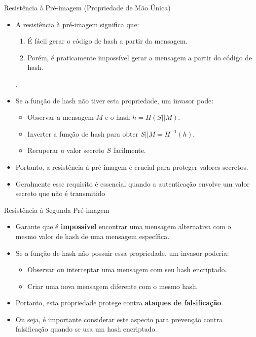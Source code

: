 \begin{frame}{Resistência à Pré-imagem (Propriedade de Mão Única)}
    \begin{itemize}
        \item A resistência à pré-imagem significa que:
              \begin{enumerate}
                  \item É fácil gerar o código de hash a partir da mensagem.
                  \item Porém, é praticamente impossível gerar a mensagem a partir do código de hash.
              \end{enumerate}
              .
        \item Se a função de hash não tiver esta propriedade, um invasor pode:
              \begin{itemize}
                  \item Observar a mensagem $M$ e o hash $h = H(S || M)$.
                  \item Inverter a função de hash para obter $S || M = H^{-1}(h)$.
                  \item Recuperar o valor secreto $S$ facilmente.
              \end{itemize}
        \item Portanto, a resistência à pré-imagem é crucial para proteger valores secretos.
        \item Geralmente esse requisito é essencial quando a autenticação envolve um valor secreto que não é transmitido
    \end{itemize}
\end{frame}

\begin{frame}{Resistência à Segunda Pré-imagem}
    \begin{itemize}
        \item Garante que é \textbf{impossível} encontrar uma mensagem alternativa com o mesmo valor de hash de uma mensagem específica.

        \item Se a função de hash não possuir essa propriedade, um invasor poderia:
              \begin{itemize}
                  \item Observar ou interceptar uma mensagem com seu hash encriptado.
                  \item Criar uma nova mensagem diferente com o mesmo hash.
              \end{itemize}
        \item Portanto, esta propriedade protege contra \textbf{ataques de falsificação}.
        \item Ou seja, é importante considerar este aspecto para prevenção contra falsificação quando se usa um hash encriptado.
    \end{itemize}
\end{frame}


